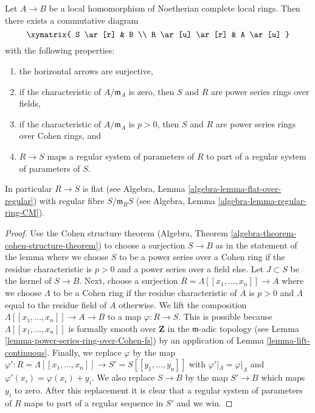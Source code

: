 \begin{lemma}
\label{lemma-embed-map-Noetherian-complete-local-rings}
Let $A \to B$ be a local homomorphism of Noetherian complete local rings.
Then there exists a commutative diagram
$$
\xymatrix{
S \ar[r] & B \\
R \ar[u] \ar[r] & A \ar[u]
}
$$
with the following properties:
\begin{enumerate}
\item the horizontal arrows are surjective,
\item if the characteristic of $A/\mathfrak m_A$ is zero, then $S$ and $R$
are power series rings over fields,
\item if the characteristic of $A/\mathfrak m_A$ is $p > 0$, then $S$ and $R$
are power series rings over Cohen rings, and
\item $R \to S$ maps a regular system of parameters of $R$ to part of a
regular system of parameters of $S$.
\end{enumerate}
In particular $R \to S$ is flat (see Algebra,
Lemma \ref{algebra-lemma-flat-over-regular}) with regular fibre
$S/\mathfrak m_R S$ (see Algebra, Lemma \ref{algebra-lemma-regular-ring-CM}).
\end{lemma}

\begin{proof}
Use the Cohen structure theorem
(Algebra, Theorem \ref{algebra-theorem-cohen-structure-theorem})
to choose a surjection $S \to B$ as in the statement of the lemma
where we choose $S$ to be a power series over a Cohen ring if the
residue characteristic is $p > 0$ and a power series over a field else.
Let $J \subset S$ be the kernel of $S \to B$.
Next, choose a surjection $R = \Lambda[[x_1, \ldots, x_n]] \to A$ where
we choose $\Lambda$ to be a Cohen ring if the residue characteristic of
$A$ is $p > 0$ and $\Lambda$ equal to the residue field of $A$ otherwise.
We lift the composition $\Lambda[[x_1, \ldots, x_n]] \to A \to B$
to a map $\varphi : R \to S$. This is possible because
$\Lambda[[x_1, \ldots, x_n]]$ is formally smooth over $\mathbf{Z}$
in the $\mathfrak m$-adic topology (see
Lemma \ref{lemma-power-series-ring-over-Cohen-fs})
by an application of Lemma \ref{lemma-lift-continuous}.
Finally, we replace $\varphi$ by the map
$\varphi' : R = \Lambda[[x_1, \ldots, x_n]] \to S' = S[[y_1, \ldots, y_n]]$
with $\varphi'|_\Lambda = \varphi|_\Lambda$ and
$\varphi'(x_i) = \varphi(x_i) + y_i$. We also replace $S \to B$
by the map $S' \to B$ which maps $y_i$ to zero. After this replacement
it is clear that a regular system of parameters of $R$ maps to part of a
regular sequence in $S'$ and we win.
\end{proof}







